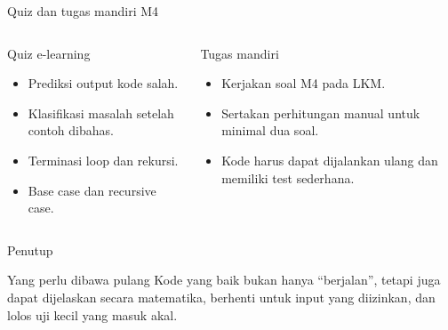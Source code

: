 \documentclass[aspectratio=169,11pt]{beamer}
\begin{document}
\begin{frame}{Quiz dan tugas mandiri M4}
\begin{columns}[T]
\begin{block}{Quiz e-learning}
\begin{itemize}\small
  \item Prediksi output kode salah.
  \item Klasifikasi masalah setelah contoh dibahas.
  \item Terminasi loop dan rekursi.
  \item Base case dan recursive case.
\end{itemize}
\end{block}
\begin{block}{Tugas mandiri}
\begin{itemize}\small
  \item Kerjakan soal M4 pada LKM.
  \item Sertakan perhitungan manual untuk minimal dua soal.
  \item Kode harus dapat dijalankan ulang dan memiliki test sederhana.
\end{itemize}
\end{block}
\end{columns}
\end{frame}

\begin{frame}{Penutup}
\begin{block}{Yang perlu dibawa pulang}
Kode yang baik bukan hanya ``berjalan'', tetapi juga dapat dijelaskan secara matematika, berhenti untuk input yang diizinkan, dan lolos uji kecil yang masuk akal.
\end{block}
\begin{center}
\end{center}
\end{frame}
\end{document}
